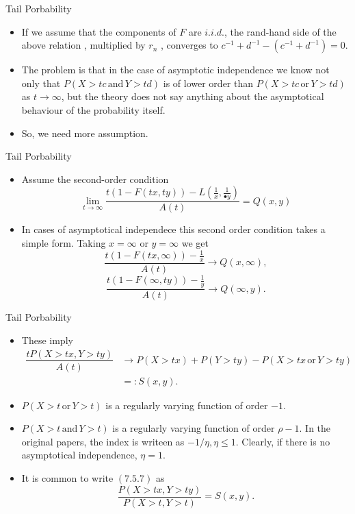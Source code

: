\documentclass[11pt]{beamer}
\begin{document}
\begin{frame}{Tail Porbability}
\begin{itemize}
\item  If we assume that the components of $F$ are $i.i.d.$, the rand-hand side of the above relation , multiplied by $r_n$ , converges to $c^{-1}+d^{-1}-(c^{-1}+d^{-1})=0$. 
\item The problem is that in the case of asymptotic independence we know not only that $P(X>tc \,\text{and}\, Y>td)$ is of lower order than $P(X>tc \, \text{or}\, Y>td)$ as $t\to \infty$, but the theory does not say anything about the asymptotical behaviour of the probability itself.
\item So, we need more assumption.
\end{itemize}
\end{frame}
\begin{frame}{Tail Porbability}
\begin{itemize}
 \item Assume the second-order condition
 \begin{displaymath}
 \lim_{t\to \infty} \dfrac{t(1-F(tx,ty))-L(\frac{1}{x},\frac{1}{•y})}{A(t)}=Q(x,y)
 \end{displaymath}
\item In cases of asymptotical independece this second order condition takes a simple form. Taking $x=\infty$ or $y=\infty$ we get
\begin{displaymath}
 \dfrac{t(1-F(tx,\infty))-\frac{1}{x}}{A(t)}\to Q(x,\infty),
\end{displaymath} 
 \begin{displaymath}
 \dfrac{t(1-F(\infty,ty))-\frac{1}{y}}{A(t)}\to Q(\infty,y).
\end{displaymath} 
\end{itemize}
\end{frame}
\begin{frame}{Tail Porbability}
\begin{itemize}
\item These imply
\begin{equation} 
\begin{split}
\dfrac{tP(X>tx, Y>ty)}{A(t)} &\to P(X>tx)+P(Y>ty)-P(X>tx\, \text{or}\, Y>ty)\\
 &=:S(x,y).      
\end{split} \tag{7.5.7}
\end{equation}
\item $P(X>t\, \text{or}\, Y>t)$ is  a regularly varying function of order $-1$.
\item  $P(X>t\, \text{and}\, Y>t)$ is  a regularly varying function of order $\rho-1.$ In the original papers, the index is writeen as $-1/\eta, \eta\le 1$. Clearly, if there is no asymptotical independence, $\eta=1$.
\item It is common to write $(7.5.7)$ as 
\begin{displaymath}
\dfrac{P(X>tx, Y>ty)}{P(X>t, Y>t)}=S(x,y).
\end{displaymath}
\end{itemize}
\end{frame}
\end{document}
